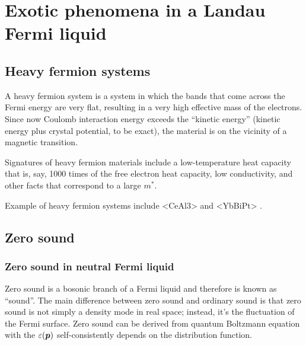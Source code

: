 \documentclass[hyperref, a4paper]{article}
\def\ce#1{<#1>}%
\begin{document}
\section{Exotic phenomena in a Landau Fermi liquid}

\subsection{Heavy fermion systems}

A heavy fermion system is a system in which 
the bands that come across the Fermi energy
are very flat, 
resulting in a very high effective mass of the electrons.
Since now Coulomb interaction energy exceeds 
the ``kinetic energy''
(kinetic energy plus crystal potential, to be exact),
the material is on the vicinity of a magnetic transition.

Signatures of heavy fermion materials include 
a low-temperature heat capacity that is, say, 1000 times 
of the free electron heat capacity,
low conductivity, 
and other facts that correspond to a large $m^*$.

Example of heavy fermion systems include \ce{CeAl3} \cite{PhysRevLett.35.1779} 
and \ce{YbBiPt} \cite{fisk1991massive}.

\subsection{Zero sound}

\subsubsection{Zero sound in neutral Fermi liquid}

Zero sound is a bosonic branch of a Fermi liquid and therefore is known as ``sound''.
The main difference between zero sound and ordinary sound
is that zero sound is not simply a density mode in real space;
instead, it's the fluctuation of the Fermi surface.
Zero sound can be derived from quantum Boltzmann equation 
with the $\varepsilon(\vb*{p})$ 
self-consistently depends on the distribution function.
\end{document}

